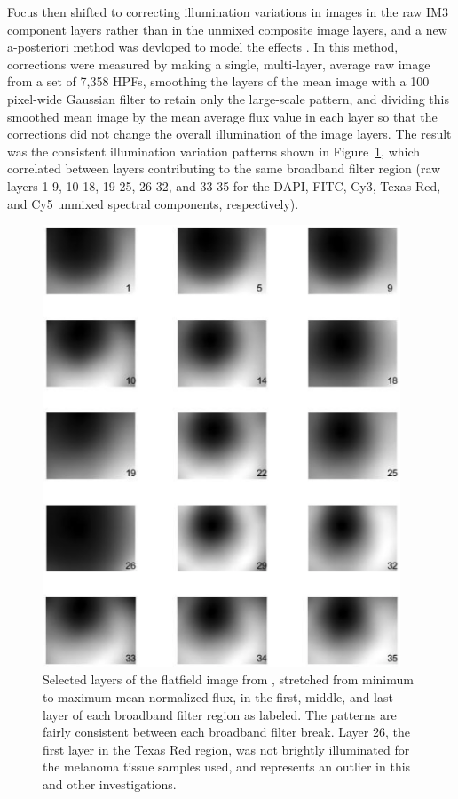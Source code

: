 \documentclass[letterpaper,11pt]{article}
\newcommand{\reffig}[1]{Figure~\ref{#1}}
\begin{document}
Focus then shifted to correcting illumination variations in images in the raw IM3 component layers rather than in the unmixed composite image layers, and a new a-posteriori method was devloped to model the effects \cite{Alex_flatfielding_2}. In this method, corrections were measured by making a single, multi-layer, average raw image from a set of 7,358 HPFs, smoothing the layers of the mean image with a 100 pixel-wide Gaussian filter to retain only the large-scale pattern, and dividing this smoothed mean image by the mean average flux value in each layer so that the corrections did not change the overall illumination of the image layers. The result was the consistent illumination variation patterns shown in \reffig{fig:second_flatfielding}, which correlated between layers contributing to the same broadband filter region (raw layers 1-9, 10-18, 19-25, 26-32, and 33-35 for the DAPI, FITC, Cy3, Texas Red, and Cy5 unmixed spectral components, respectively).

\begin{figure}[!ht]
\centering
\includegraphics[width=0.95\textwidth]{images/introduction/second_flatfield_image_layers}
\caption{\footnotesize Selected layers of the flatfield image from \cite{Alex_flatfielding_2}, stretched from minimum to maximum mean-normalized flux, in the first, middle, and last layer of each broadband filter region as labeled. The patterns are fairly consistent between each broadband filter break. Layer 26, the first layer in the Texas Red region, was not brightly illuminated for the melanoma tissue samples used, and represents an outlier in this and other investigations.}
\label{fig:second_flatfielding}
\end{figure}
\end{document}
